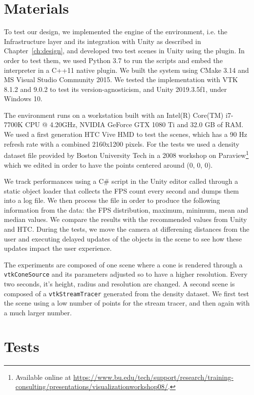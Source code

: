 \section{Materials}
\label{sec:materials}

To test our design, we implemented the engine of the environment, i.e. the Infrastructure layer and its integration with Unity as described in Chapter~\ref{ch:design}, and developed two test scenes in Unity using the plugin. In order to test them, we used  Python 3.7 to run the scripts and embed the interpreter in a C++11 native plugin. We built the system using CMake 3.14 and MS Visual Studio Community 2015. We tested the implementation with VTK 8.1.2 and 9.0.2 to test its version-agnosticism, and Unity 2019.3.5f1, under Windows 10.

The environment runs on a workstation built with an Intel(R) Core(TM) i7-7700K CPU @ 4.20GHz, NVIDIA GeForce GTX 1080 Ti and 32.0 GB of RAM. We used a first generation HTC Vive HMD to test the scenes, which has a 90 Hz refresh rate with a combined 2160x1200 pixels. For the tests we used a density dataset file provided by Boston University Tech in a 2008 workshop on Paraview\footnote{Available online at \url{https://www.bu.edu/tech/support/research/training-consulting/presentations/visualizationworkshop08/}.} which we edited in order to have the points centered around (0, 0, 0). 

We track performances using a C\# script in the Unity editor called through a static object loader that collects the FPS count every second and dumps them into a log file. We then process the file in order to produce the following information from the data: the FPS distribution, maximum, minimum, mean and median values. We compare the results with the recommended values from Unity and HTC. During the tests, we move the camera at differening distances from the user and executing delayed updates of the objects in the scene to see how these updates impact the user experience.

The experiments are composed of one scene where a cone is rendered through a \verb|vtkConeSource| and its parameters adjusted so to have a higher resolution. Every two seconds, it's height, radius and resolution are changed. A second scene is composed of a \verb|vtkStreamTracer| generated from the density dataset. We first test the scene using a low number of points for the stream tracer, and then again with a much larger number.

\section{Tests}

